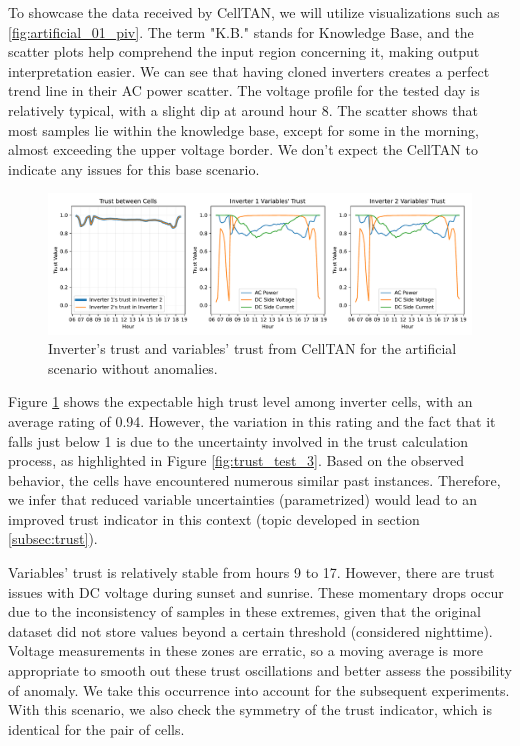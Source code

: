 To showcase the data received by CellTAN, we will utilize visualizations such as \ref{fig:artificial_01_piv}. The term "K.B." stands for Knowledge Base, and the scatter plots help comprehend the input region concerning it, making output interpretation easier.
We can see that having cloned inverters creates a perfect trend line in their AC power scatter. The voltage profile for the tested day is relatively typical, with a slight dip at around hour 8. The scatter shows that most samples lie within the knowledge base, except for some in the morning, almost exceeding the upper voltage border.
We don't expect the CellTAN to indicate any issues for this base scenario.

\begin{figure}[h!]
    \centering
    \includegraphics[width=\linewidth]{figures/chapter5/results/artificial/42_results_test_clone_01.pdf}
    \caption{Inverter's trust and variables' trust from CellTAN for the artificial scenario without anomalies.}
    \label{fig:artificial_results_01}
\end{figure}

Figure \ref{fig:artificial_results_01} shows the expectable high trust level among inverter cells, with an average rating of 0.94. However, the variation in this rating and the fact that it falls just below 1 is due to the uncertainty involved in the trust calculation process, as highlighted in Figure \ref{fig:trust_test_3}. Based on the observed behavior, the cells have encountered numerous similar past instances. Therefore, we infer that reduced variable uncertainties (parametrized) would lead to an improved trust indicator in this context (topic developed in section \ref{subsec:trust}).

Variables' trust is relatively stable from hours 9 to 17. However, there are trust issues with DC voltage during sunset and sunrise. These momentary drops occur due to the inconsistency of samples in these extremes, given that the original dataset did not store values beyond a certain threshold (considered nighttime). Voltage measurements in these zones are erratic, so a moving average is more appropriate to smooth out these trust oscillations and better assess the possibility of anomaly. We take this occurrence into account for the subsequent experiments.
With this scenario, we also check the symmetry of the trust indicator, which is identical for the pair of cells.

